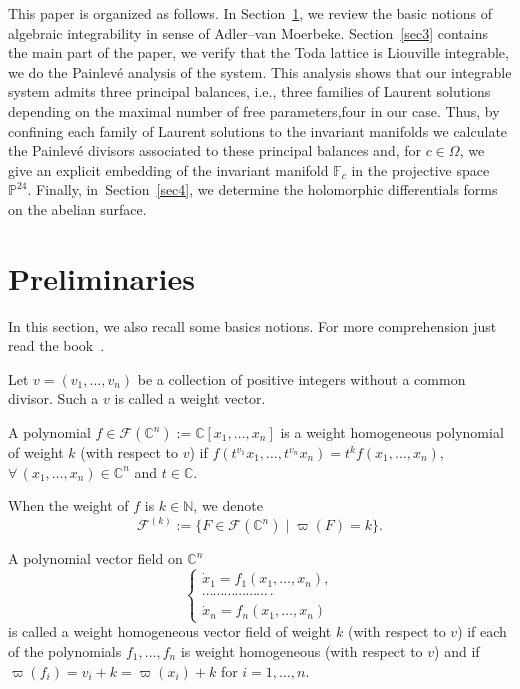 \documentclass[pdftex]{sigma}
\numberwithin{equation}{section}
\begin{document}
This paper is organized as follows. In Section~\ref{sec2}, we review the
basic notions of algebraic integrability in sense of Adler--van Moerbeke. Section~\ref{sec3} contains the main part of the paper, we verify
that the  Toda lattice is Liouville
integrable, we do the Painlev\'{e} analysis of the system. This
analysis shows that our integrable system admits three principal
balances, i.e., three families of Laurent solutions depending on the
maximal number of free parameters,four in our case. Thus, by
confining each family of Laurent solutions to the invariant
manifolds we calculate the Painlev\'{e} divisors associated to these
principal balances and, for $c\in \Omega$, we give an explicit
embedding of the invariant manifold $\mathbb{F}_c$ in the
projective space $\mathbb{P}^{24}$. Finally, in~Section~\ref{sec4}, we
determine the holomorphic differentials forms on the abelian
surface.

\section{Preliminaries}\label{sec2}
In this section, we also recall some basics notions. For more
comprehension just read the book~\cite{al_Moer3}.

 Let $v =
(v_1, \dots, v_n)$ be a collection of positive integers
without a common divisor. Such a $v$ is called a weight vector.
\begin{Definition}
 A polynomial $f\in \mathcal{F}(\mathbb{C}^n):=\mathbb{C}[x_1,\dots,x_n]$ is a weight homogeneous polynomial of weight
$k$ (with respect to $v$) if
$f(t^{v_1}x_1,\dots,t^{v_n}x_n)=t^kf(x_1,\dots,x_n)$, $\forall \, (x_1,\dots,x_n)\in
\mathbb{C}^n$ and $t\in \mathbb{C}$.
\end{Definition}
When the weight of $f$ is $k\in \mathbb{N}$, we denote
\[\mathcal{F}^{(k)}:= \{F\in\mathcal{F}(\mathbb{C}^n)\mid \varpi(F) = k
\}.\]

\begin{Definition}
A polynomial vector field on $\mathbb{C}^n$
\begin{equation}\label{polyvect}
\begin{cases}
\dot{x}_1 = f_1(x_1,\dots, x_n),\\
 \cdots\cdots\cdots\cdots\cdots\cdots\cdot \\
\dot{x}_n = f_n(x_1,\dots, x_n)
 \end{cases}
\end{equation}
is called a weight homogeneous vector field of weight $k$ (with
respect to $v$) if each of the polynomials $f_1,\dots,f_n$ is
weight homogeneous (with respect to $v$) and if
$\varpi(f_i )=v_i + k =\varpi(x_i)+ k$ for
$i=1,\dots,n$.
\end{Definition}
\end{document}
